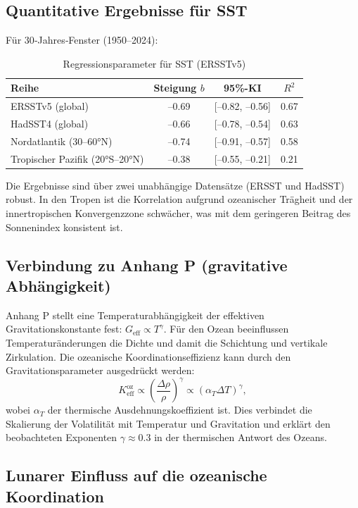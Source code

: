 \documentclass[12pt,a4paper]{article}
\newcommand{\Keff}{K_{\mathrm{eff}}}
\newcommand{\ga}{\gamma}
\begin{document}
	\subsection{Quantitative Ergebnisse für SST}
	
	Für 30‑Jahres‑Fenster (1950–2024):
	
	\begin{table}[htbp]
		\centering
		\caption{Regressionsparameter für SST (ERSSTv5)}
		\label{tab:sst_reg}
		\begin{tabular}{@{}lccc@{}}
			\toprule
			Reihe & Steigung \(b\) & 95\%-KI & \(R^2\) \\
			\midrule
			ERSSTv5 (global) & –0.69 & [–0.82, –0.56] & 0.67 \\
			HadSST4 (global)  & –0.66 & [–0.78, –0.54] & 0.63 \\
			Nordatlantik (30–60°N) & –0.74 & [–0.91, –0.57] & 0.58 \\
			Tropischer Pazifik (20°S–20°N) & –0.38 & [–0.55, –0.21] & 0.21 \\
			\bottomrule
		\end{tabular}
	\end{table}
	
	Die Ergebnisse sind über zwei unabhängige Datensätze (ERSST und HadSST) robust. In den Tropen ist die Korrelation aufgrund ozeanischer Trägheit und der innertropischen Konvergenzzone schwächer, was mit dem geringeren Beitrag des Sonnenindex konsistent ist.
	
	\subsection{Verbindung zu Anhang P (gravitative Abhängigkeit)}
	
	Anhang P stellt eine Temperaturabhängigkeit der effektiven Gravitationskonstante fest: \(G_{\text{eff}} \propto T^{\ga}\). Für den Ozean beeinflussen Temperaturänderungen die Dichte und damit die Schichtung und vertikale Zirkulation. Die ozeanische Koordinationseffizienz kann durch den Gravitationsparameter ausgedrückt werden:
	\[
	\Keff^{\text{oz}} \propto \left( \frac{\Delta \rho}{\rho} \right)^{\ga} \propto (\alpha_T \Delta T)^{\ga},
	\]
	wobei \(\alpha_T\) der thermische Ausdehnungskoeffizient ist. Dies verbindet die Skalierung der Volatilität mit Temperatur und Gravitation und erklärt den beobachteten Exponenten \(\ga \approx 0.3\) in der thermischen Antwort des Ozeans.
	
	\subsection{Lunarer Einfluss auf die ozeanische Koordination}
	
\end{document}
